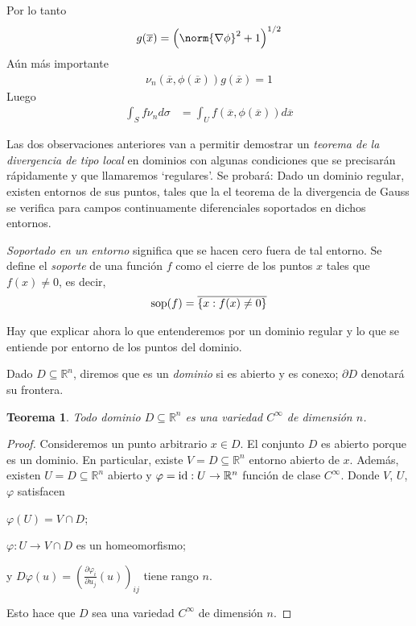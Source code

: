 \documentclass{report}
\newcommand{\realNumbers}{\mathbb{R}}
\newtheorem{theorem}{Teorema}
\theoremstyle{remark}
\DeclareMathOperator{\support}{\textnormal{sop}}
\begin{document}
  Por lo tanto
  \begin{align}
    g(\overline{x})
    =
    \left( \norm{\nabla \phi}^2 + 1 \right)^{1 / 2}
  \end{align}
  Aún más importante
  \begin{align}
    \nu_n(\overline{x}, \phi(\overline{x}))
    g(\overline{x})
    =
    1
  \end{align}
  Luego
  \begin{align}
    \int_S f \nu_n d \sigma
    &=
    \int_U
      f(\overline{x}, \phi(\overline{x}))
    d \overline{x}
  \end{align}

  \newpage
  Las dos observaciones anteriores van a permitir demostrar un \emph{teorema de la divergencia de tipo local} en dominios con algunas condiciones que se precisarán rápidamente y que llamaremos `regulares'.
  Se probará:
  Dado un dominio regular, existen entornos de sus puntos, tales que la el teorema de la divergencia de Gauss se verifica para campos continuamente diferenciales soportados en dichos entornos.

  \emph{Soportado en un entorno} significa que se hacen cero fuera de tal entorno.
  Se define el \emph{soporte} de una función \(f\) como el cierre de los puntos \(x\) tales que \(f(x) \neq 0\), es decir,
  \begin{align}
    \support(f)
    =
    \overline{\{x : f(x) \neq 0\}}
  \end{align}

  Hay que explicar ahora lo que entenderemos por un dominio regular y lo que se entiende por entorno de los puntos del dominio.

  Dado \(D \subseteq \realNumbers^n\), diremos que es un \emph{dominio} si es abierto y es conexo;
  \(\partial D\) denotará su frontera.

  \begin{theorem}
    Todo dominio \(D \subseteq \realNumbers^n\) es una variedad \(C^{\infty}\) de dimensión \(n\).
  \end{theorem}
  \begin{proof}
    Consideremos un punto arbitrario \(x \in D\).
    El conjunto \(D\) es abierto porque es un dominio.
    En particular, existe \(V = D \subseteq \realNumbers^n\) entorno abierto de \(x\).
    \newcommand{\identity}{\textnormal{id}}
    Además, existen \(U = D \subseteq \realNumbers^n\) abierto y \(\varphi = \identity : U \rightarrow \realNumbers^n\) función de clase \(C^{\infty}\).
    Donde \(V\), \(U\), \(\varphi\) satisfacen
    \begin{enumerate*}
      \item \(\varphi(U) = V \cap D\);
      \item \(\varphi : U \rightarrow V \cap D\) es un homeomorfismo;
      \item y \(D \varphi (u) = \left( \frac{\partial \varphi_i}{\partial u_j}(u) \right)_{i j}\) tiene rango \(n\).
    \end{enumerate*}
    Esto hace que \(D\) sea una variedad \(C^{\infty}\) de dimensión \(n\).
  \end{proof}
\end{document}
